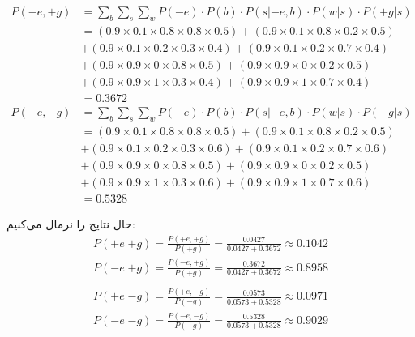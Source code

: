 \begin{ابجد}
\begin{align*}
    P(-e, +g) & = \sum_b\sum_s\sum_w P(-e) \cdot P(b) \cdot P(s|-e,b) \cdot P(w|s) \cdot P(+g|s)                        \\
              & = (0.9 \times 0.1 \times 0.8 \times 0.8 \times 0.5) + (0.9 \times 0.1 \times 0.8 \times 0.2 \times 0.5) \\
              & + (0.9 \times 0.1 \times 0.2 \times 0.3 \times 0.4) + (0.9 \times 0.1 \times 0.2 \times 0.7 \times 0.4) \\
              & + (0.9 \times 0.9 \times 0 \times 0.8 \times 0.5) + (0.9 \times 0.9 \times 0 \times 0.2 \times 0.5)     \\
              & + (0.9 \times 0.9 \times 1 \times 0.3 \times 0.4) + (0.9 \times 0.9 \times 1 \times 0.7 \times 0.4)     \\
              & = 0.3672                                                                                                \\
    P(-e, -g) & = \sum_b\sum_s\sum_w P(-e) \cdot P(b) \cdot P(s|-e,b) \cdot P(w|s) \cdot P(-g|s)                        \\
              & = (0.9 \times 0.1 \times 0.8 \times 0.8 \times 0.5) + (0.9 \times 0.1 \times 0.8 \times 0.2 \times 0.5) \\
              & + (0.9 \times 0.1 \times 0.2 \times 0.3 \times 0.6) + (0.9 \times 0.1 \times 0.2 \times 0.7 \times 0.6) \\
              & + (0.9 \times 0.9 \times 0 \times 0.8 \times 0.5) + (0.9 \times 0.9 \times 0 \times 0.2 \times 0.5)     \\
              & + (0.9 \times 0.9 \times 1 \times 0.3 \times 0.6) + (0.9 \times 0.9 \times 1 \times 0.7 \times 0.6)     \\
              & = 0.5328
\end{align*}

حال نتایج را نرمال می‌کنیم:
\begin{align*}
    P(+e|+g) = \frac{P(+e,+g)}{P(+g)} = \frac{0.0427}{0.0427 + 0.3672} \approx 0.1042 \\
    P(-e|+g) = \frac{P(-e,+g)}{P(+g)} = \frac{0.3672}{0.0427 + 0.3672} \approx 0.8958 \\
    \\
    P(+e|-g) = \frac{P(+e,-g)}{P(-g)} = \frac{0.0573}{0.0573 + 0.5328} \approx 0.0971 \\
    P(-e|-g) = \frac{P(-e,-g)}{P(-g)} = \frac{0.5328}{0.0573 + 0.5328} \approx 0.9029
\end{align*}


\end{ابجد}
